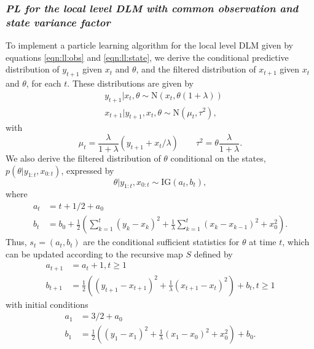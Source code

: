 \subsubsection{\emph{PL for the local level DLM with common observation and state variance factor} \label{sec:pl:ll}}

To implement a particle learning algorithm for the local level DLM given by equations \eqref{eqn:ll:obs} and \eqref{eqn:ll:state}, we derive the conditional predictive distribution of $y_{t+1}$ given $x_t$ and $\theta$, and the filtered distribution of $x_{t+1}$ given $x_t$ and $\theta$, for each $t$. These distributions are given by
\begin{align}
&y_{t+1}|x_t,\theta \sim \mbox{N}\left(x_t,\theta(1+\lambda)\right) \label{eqn:pl:ll:pred} \\
&x_{t+1}|y_{t+1},x_t,\theta \sim \mbox{N}(\mu_t,\tau^2) \label{eqn:pl:ll:state},
\end{align}
with
\begin{equation}
\mu_t = \frac{\lambda}{1+\lambda}(y_{t+1} + x_t / \lambda) \qquad \tau^2 = \theta\frac{\lambda}{1+\lambda}. \label{eqn:pl:ll:statemv}
\end{equation}
We also derive the filtered distribution of $\theta$ conditional on the states, $p(\theta|y_{1:t},x_{0:t})$, expressed by
\begin{equation}
\theta|y_{1:t},x_{0:t} \sim \mbox{IG}(a_t,b_t),
\end{equation}
where
\begin{align*}
a_t &= t + 1/2 + a_0 \\
b_t &= b_0 + \frac{1}{2}\left(\sum_{k=1}^t (y_k - x_k)^2 + \frac{1}{\lambda}\sum_{k=1}^t (x_k - x_{k-1})^2 + x_0^2\right).
\end{align*}
Thus, $s_t = (a_t,b_t)$ are the conditional sufficient statistics for $\theta$ at time $t$, which can be updated according to the recursive map $S$ defined by
\begin{align}
a_{t+1} &= a_t + 1, t \ge 1 \label{eqn:pl:ll:a} \\
b_{t+1} &= \frac{1}{2}\left((y_{t+1}-x_{t+1})^2 + \frac{1}{\lambda}(x_{t+1}-x_t)^2\right) + b_t, t \ge 1 \label{eqn:pl:ll:b}
\end{align}
with initial conditions
\begin{align*}
a_1 &= 3/2 + a_0 \\
b_1 &= \frac{1}{2}\left((y_1-x_1)^2 + \frac{1}{\lambda}(x_1-x_0)^2 + x_0^2\right) + b_0.
\end{align*}

